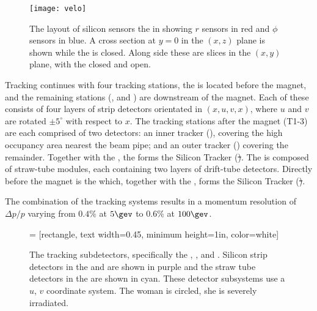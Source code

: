 
\begin{figure}
  \begin{center}
    \texttt{[image: velo]}
  \end{center}
  \caption[\lhcb \velo]
  {\small
    The layout of silicon sensors the \velo in showing $r$ sensors in red and $\phi$ sensors in
    blue.
    A cross section at $y=0$ in the $(x,z)$ plane is shown while the \velo is closed.
    Along side these are slices in the $(x,y)$ plane, with the \velo closed and open.
  }
  \label{fig:lhcb:velo}
\end{figure}


Tracking continues with four tracking stations, the \ttracker is located
before the magnet, and the remaining stations (\Tone, \Ttwo and \Tthree) are downstream of the magnet.
Each of these consists of four layers of strip detectors orientated in $(x, u, v, x)$, where $u$
and $v$ are rotated $\pm5^\circ$ with respect to $x$.
The tracking stations after the magnet (T1-3) are each comprised of two detectors: an inner
tracker (\intr), covering the high occupancy area nearest the beam pipe; and an outer tracker (\ot)
covering the remainder.
Together with the \ttracker, the \intr forms the Silicon Tracker (\st).
The \ot is composed of straw-tube modules, each containing two layers of drift-tube detectors.
Directly before the magnet is the \ttracker which, together with the \intr, forms the Silicon
Tracker (\st).

The combination of the tracking systems results in a momentum resolution of $\Delta p/p$ varying
from $0.4\%$ at $5\gev$ to $0.6\%$ at $100\gev$.

\begin{figure}
  \begin{center}
     = [rectangle, text width=0.45\textwidth, minimum height=1in, color=white]
  \end{center}
  \caption[\lhcb tracking stations]
  {\small
    The \lhcb tracking subdetectors, specifically the \ttracker, \Tone, \Ttwo and \Tthree.
    Silicon strip detectors in the \intr and \intr are shown in purple and the straw tube detectors
    in the \ot are shown in cyan.
    These detector subsystems use a $u$, $v$ coordinate system.
    The woman is circled, she is severely irradiated.
  }
  \label{fig:lhcb:tracking}
\end{figure}



